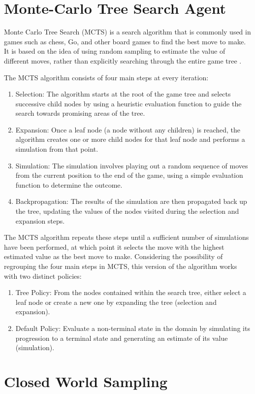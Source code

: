 \section{Monte-Carlo Tree Search Agent}
\label{MCTS}

Monte Carlo Tree Search (MCTS) is a search algorithm that is commonly used in games such as chess, Go, and other board games to find the best move to make. It is based on the idea of using random sampling to estimate the value of different moves, rather than explicitly searching through the entire game tree \citep{MCTSSurvey}.

The MCTS algorithm consists of four main steps at every iteration:

\begin{enumerate}
	\item Selection: The algorithm starts at the root of the game tree and selects successive child nodes by using a heuristic evaluation function to guide the search towards promising areas of the tree.
	
	\item Expansion: Once a leaf node (a node without any children) is reached, the algorithm creates one or more child nodes for that leaf node and performs a simulation from that point.
	
	\item Simulation: The simulation involves playing out a random sequence of moves from the current position to the end of the game, using a simple evaluation function to determine the outcome.
	
	\item Backpropagation: The results of the simulation are then propagated back up the tree, updating the values of the nodes visited during the selection and expansion steps.
	
\end{enumerate}

The MCTS algorithm repeats these steps until a sufficient number of simulations have been performed, at which point it selects the move with the highest estimated value as the best move to make. Considering the possibility of regrouping the four main steps in MCTS, this version of the algorithm works with two distinct policies: 

\begin{enumerate}
	\item Tree Policy: From the nodes contained within the search tree, either select a leaf node or create a new one by expanding the tree (selection and expansion).
	
	\item Default Policy: Evaluate a non-terminal state in the domain by simulating its progression to a terminal state and generating an estimate of its value (simulation).
\end{enumerate}











\section{Closed World Sampling}












